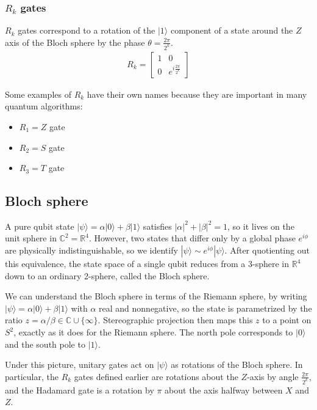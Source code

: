 \documentclass[11pt]{article}
\begin{document}
\subsubsection{$R_k$ gates}

$R_k$ gates correspond to a rotation of the $\vert 1 \rangle$ component of a state around the $Z$ axis of the Bloch sphere by the phase $\theta = \frac{2\pi}{2^k}$.
\begin{align*}
R_k = \begin{bmatrix} 1 & 0 \\ 0 & e^{i\frac{2\pi}{2^k}} \end{bmatrix}
\end{align*}

Some examples of $R_k$ have their own names because they are important in many quantum algorithms:
\begin{itemize}
    \item $R_1 = Z$ gate
    \item $R_2 = S$ gate
    \item $R_3 = T$ gate
\end{itemize}

\subsection{Bloch sphere}

A pure qubit state $|\psi\rangle = \alpha|0\rangle + \beta|1\rangle$ satisfies $|\alpha|^2 + |\beta|^2 = 1$, so it lives on the unit sphere in $\mathbb{C}^2 = \mathbb{R}^4$. However, two states that differ only by a global phase $e^{i\phi}$ are physically indistinguishable, so we identify $|\psi\rangle \sim e^{i\phi}|\psi\rangle$. After quotienting out this equivalence, the state space of a single qubit reduces from a 3-sphere in $\mathbb{R}^4$ down to an ordinary 2-sphere, called the Bloch sphere.

We can understand the Bloch sphere in terms of the Riemann sphere, by writing $|\psi\rangle = \alpha|0\rangle + \beta|1\rangle$ with $\alpha$ real and nonnegative, so the state is parametrized by the ratio $z = \alpha/\beta \in \mathbb{C} \cup \{\infty\}$. Stereographic projection then maps this $z$ to a point on $S^2$, exactly as it does for the Riemann sphere. The north pole corresponds to $|0\rangle$ and the south pole to $|1\rangle$.

Under this picture, unitary gates act on $|\psi\rangle$ as rotations of the Bloch sphere. In particular, the $R_k$ gates defined earlier are rotations about the $Z$-axis by angle $\frac{2\pi}{2^k}$, and the Hadamard gate is a rotation by $\pi$ about the axis halfway between $X$ and $Z$.
\end{document}
